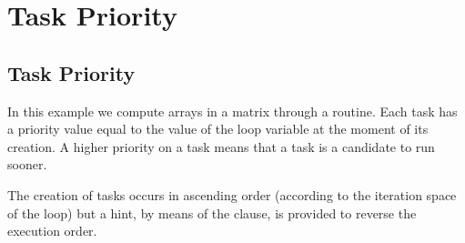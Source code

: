 \pagebreak
\section{Task Priority}
\label{sec:task_priority}



\subsection{Task Priority}
\label{subsec:task_priority}

In this example we compute arrays in a matrix through a  routine.
Each task has a priority value equal to the value of the loop variable  at the
moment of its creation. A higher priority on a task means that a task is a candidate
to run sooner.

The creation of tasks occurs in ascending order (according to the iteration space of
the loop) but a hint, by means of the  clause, is provided to reverse
the execution order.



